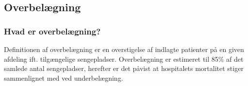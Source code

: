 \subsection{Overbelægning}
\subsubsection{Hvad er overbelægning?}
Definitionen af overbelægning er en overstigelse af indlagte patienter på en given afdeling ift. tilgængelige sengepladser. Overbelægning er estimeret til 85\% af det samlede antal sengepladser, herefter er det påvist at hospitalets mortalitet  stiger sammenlignet med ved underbelægning. \citep{dodlighed2014}





